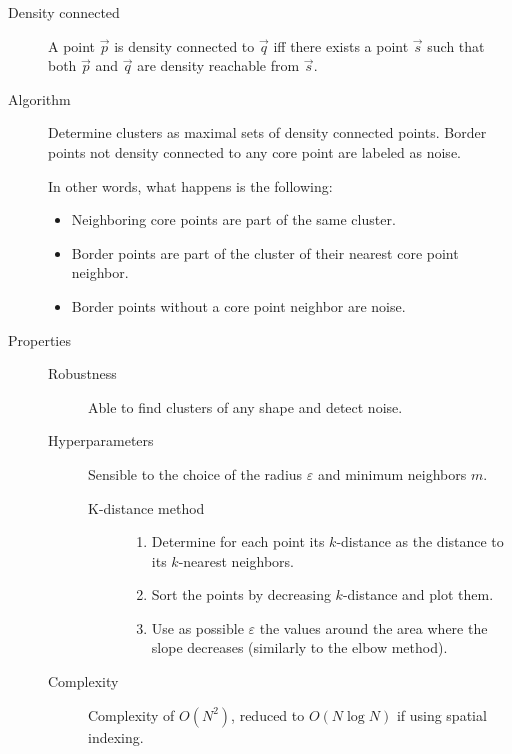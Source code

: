 \begin{description}
    \item[Density connected] 
        A point $\vec{p}$ is density connected to $\vec{q}$ iff there exists a point $\vec{s}$ 
        such that both $\vec{p}$ and $\vec{q}$ are density reachable from $\vec{s}$.

    \item[Algorithm] 
        Determine clusters as maximal sets of density connected points.
        Border points not density connected to any core point are labeled as noise.

        In other words, what happens is the following:
        \begin{itemize}
            \item Neighboring core points are part of the same cluster.
            \item Border points are part of the cluster of their nearest core point neighbor.
            \item Border points without a core point neighbor are noise.
        \end{itemize}

    \item[Properties] \phantom{}
        \begin{description}
            \item[Robustness]
                Able to find clusters of any shape and detect noise.

            \item[Hyperparameters]
                Sensible to the choice of the radius $\varepsilon$ and minimum neighbors $m$.

                \begin{description}
                    \item[K-distance method] \phantom{}
                        \begin{enumerate}
                            \item Determine for each point its $k$-distance as the distance to its $k$-nearest neighbors.
                            \item Sort the points by decreasing $k$-distance and plot them.
                            \item Use as possible $\varepsilon$ the values around the area where the slope decreases (similarly to the elbow method).
                        \end{enumerate}
                \end{description}

            \item[Complexity]
                Complexity of $O(N^2)$, reduced to $O(N \log N)$ if using spatial indexing.
        \end{description}
\end{description}


